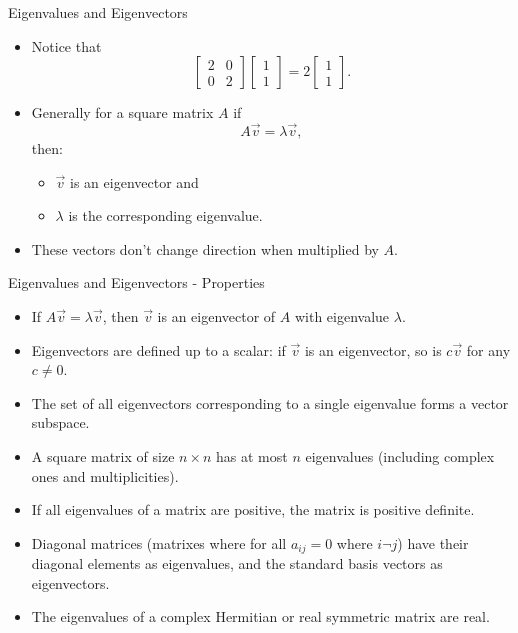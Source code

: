 \documentclass{beamer}
\begin{document}
\begin{frame}{Eigenvalues and Eigenvectors}
  \begin{itemize}
    \item Notice that 
    \begin{equation}
        \begin{bmatrix} 2 & 0 \\ 0 & 2 \end{bmatrix}\begin{bmatrix} 1 \\ 1 \end{bmatrix} = 2\begin{bmatrix} 1 \\ 1 \end{bmatrix}. 
    \end{equation}
    \item Generally for a square matrix \(A\) if
    \begin{equation}
        A\vec{v} = \lambda \vec{v},
    \end{equation}
    then:
    \begin{itemize}
      \item $\vec{v}$ is an eigenvector and
      \item $\lambda$ is the corresponding eigenvalue.
    \end{itemize}
    \item These vectors don't change direction when multiplied by $A$.
  \end{itemize}
\end{frame}

\begin{frame}{Eigenvalues and Eigenvectors - Properties}
  \begin{itemize}
    \item If $A \vec{v} = \lambda \vec{v}$, then $\vec{v}$ is an eigenvector of $A$ with eigenvalue $\lambda$.
    \item Eigenvectors are defined up to a scalar: if $\vec{v}$ is an eigenvector, so is $c\vec{v}$ for any $c \neq 0$.
    \item The set of all eigenvectors corresponding to a single eigenvalue forms a vector subspace.
    \item A square matrix of size $n \times n$ has at most $n$ eigenvalues (including complex ones and multiplicities).
    \item If all eigenvalues of a matrix are positive, the matrix is positive definite.
    \item Diagonal matrices (matrixes where for all $a_{ij}=0$ where $i\neg j$) have their diagonal elements as eigenvalues, and the standard basis vectors as eigenvectors.
    \item The eigenvalues of a complex Hermitian or real symmetric matrix are real.
  \end{itemize}
\end{frame}
\end{document}
